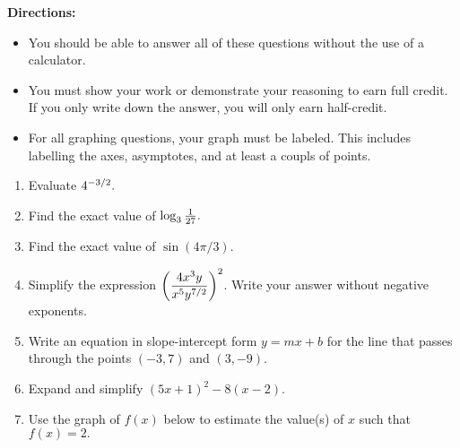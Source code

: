 \documentclass[12pt]{article}
\begin{document}
\textbf{Directions:} 
\begin{itemize}
\item You should be able to answer all of these questions without the use of a calculator.
\item You must show your work  or demonstrate your reasoning to earn full credit. If you only write down the answer, you will only earn half-credit.
\item For all graphing questions, your graph must be labeled. This includes labelling the axes, asymptotes, and at least a coupls of points. 
\end{itemize}

\begin{enumerate}

\item Evaluate ${\large{4^{-3/2}}}.$

\item Find the exact value of  ${\large{\log_{3}{\frac{1}{27}}}}.$

\item Find the exact value of $\sin ( 4 \pi /3).$

\item  Simplify the expression $\Large{\displaystyle{\left(\frac{4x^{3}y}{x^5y^{7/2}} \right)^2}}$. Write your answer without negative exponents.\\

\item Write an equation in slope-intercept form $y=mx+b$ for the line that passes through the points $(-3,7)$ and $(3,-9)$.\\

\item Expand and simplify $(5x+1)^2-8(x-2).$\\

\item Use the graph of $f(x)$ below to estimate the value(s) of $x$ such that $f(x)=2.$



\end{enumerate}
\end{document}
